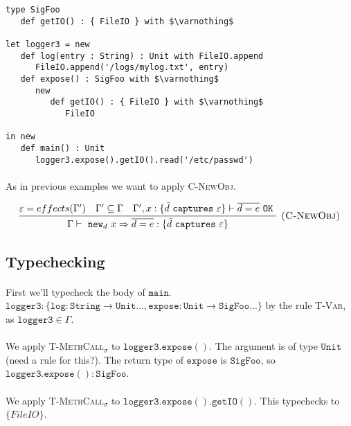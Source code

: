\documentclass{llncs}
\newcommand{\keywadj}[1]{\mathtt{#1}}
\newcommand{\keyw}[1]{\keywadj{#1}~}
\begin{document}
\vspace{-6pt}
\begin{lstlisting}[xleftmargin=20pt]
type SigFoo
   def getIO() : { FileIO } with $\varnothing$

let logger3 = new
   def log(entry : String) : Unit with FileIO.append
      FileIO.append('/logs/mylog.txt', entry)
   def expose() : SigFoo with $\varnothing$
      new
         def getIO() : { FileIO } with $\varnothing$
            FileIO

in new
   def main() : Unit
      logger3.expose().getIO().read('/etc/passwd')
\end{lstlisting}

\paragraph{}
As in previous examples we want to apply \textsc{C-NewObj}.

\[
\begin{array}{c}
\infer[\textsc{(C-NewObj)}]
	{\Gamma \vdash~\keywadj{new}_d~x \Rightarrow \overline{d = e} : \{  \bar d~\keyw{captures} \varepsilon \} }
	{\varepsilon = effects(\Gamma') & \Gamma' \subseteq \Gamma & \Gamma', x : \{ \bar d~\keyw {captures} \varepsilon \} \vdash \overline{d = e}~\keyw{OK}} \\
\end{array}
\]

\subsection*{Typechecking}

\paragraph{}
First we'll typecheck the body of $\keywadj{main}$. $\keywadj{logger3 : \{ log : String \rightarrow Unit ..., expose : Unit \rightarrow SigFoo ... \}}$ by the rule \textsc{T-Var}, as $\keywadj{logger3} \in \Gamma$.

\paragraph{}
We apply \textsc{T-MethCall$_\sigma$} to $\keywadj{logger3.expose()}$. The argument is of type $\keywadj{Unit}$ (need a rule for this?). The return type of $\keywadj{expose}$ is $\keywadj{SigFoo}$, so $\keywadj{logger3.expose() : SigFoo}$.

\paragraph{}
We apply \textsc{T-MethCall$_\sigma$} to $\keywadj{logger3.expose().getIO()}$. This typechecks  to $\{ FileIO \}$.
\end{document}
